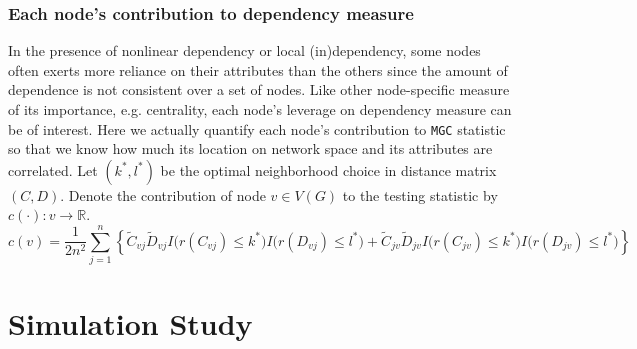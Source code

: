 \documentclass[12pt]{article}
\theoremstyle{definition}
\begin{document}
\subsubsection{Each node's contribution to dependency measure}

In the presence of nonlinear dependency or local (in)dependency, some nodes often exerts more reliance on their attributes than the others since the amount of dependence is not consistent over a set of nodes. Like other node-specific measure of its importance, e.g. centrality, each node's leverage on dependency measure can be of interest. Here we actually quantify each node's contribution to \texttt{MGC} statistic so that we know how much its location on network space and its attributes are correlated.
Let $(k^{*}, l^{*})$ be the optimal neighborhood choice in distance matrix $(C, D)$.  Denote the contribution of node $v \in V(G)$ to the testing statistic by  $c(\cdot) : v \rightarrow \mathbb{R}$. 
\begin{equation}
\label{contribution}
c(v) = \frac{1}{2 n^2} \sum\limits_{j=1}^{n} \left\{     \tilde{C}_{v j} \tilde{D}_{v j} I \big(  r (C_{v j}) \leq k^{*}  \big) I \big( r (D_{ v j }) \leq l^{*} \big) + \tilde{C}_{j v} \tilde{D}_{j v} I \big(  r (C_{j v}) \leq k^{*}  \big) I \big( r (D_{j v}) \leq l^{*} \big) \right\} 
\end{equation}

\section{Simulation Study}
\label{sec:sim}
	
\end{document}

